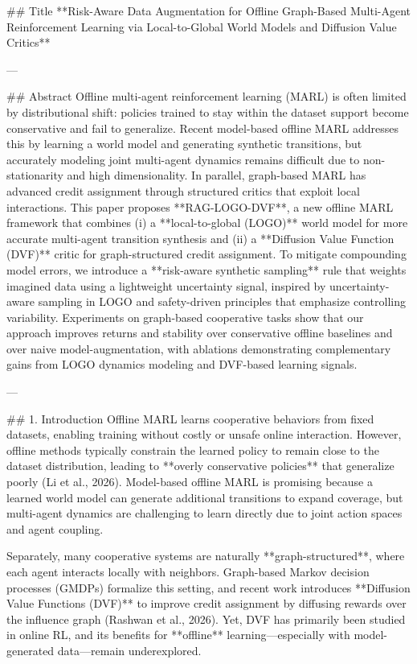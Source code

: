 ## Title  
**Risk-Aware Data Augmentation for Offline Graph-Based Multi-Agent Reinforcement Learning via Local-to-Global World Models and Diffusion Value Critics**

---

## Abstract  
Offline multi-agent reinforcement learning (MARL) is often limited by distributional shift: policies trained to stay within the dataset support become conservative and fail to generalize. Recent model-based offline MARL addresses this by learning a world model and generating synthetic transitions, but accurately modeling joint multi-agent dynamics remains difficult due to non-stationarity and high dimensionality. In parallel, graph-based MARL has advanced credit assignment through structured critics that exploit local interactions. This paper proposes **RAG-LOGO-DVF**, a new offline MARL framework that combines (i) a **local-to-global (LOGO)** world model for more accurate multi-agent transition synthesis and (ii) a **Diffusion Value Function (DVF)** critic for graph-structured credit assignment. To mitigate compounding model errors, we introduce a **risk-aware synthetic sampling** rule that weights imagined data using a lightweight uncertainty signal, inspired by uncertainty-aware sampling in LOGO and safety-driven principles that emphasize controlling variability. Experiments on graph-based cooperative tasks show that our approach improves returns and stability over conservative offline baselines and over naive model-augmentation, with ablations demonstrating complementary gains from LOGO dynamics modeling and DVF-based learning signals.

---

## 1. Introduction  
Offline MARL learns cooperative behaviors from fixed datasets, enabling training without costly or unsafe online interaction. However, offline methods typically constrain the learned policy to remain close to the dataset distribution, leading to **overly conservative policies** that generalize poorly (Li et al., 2026). Model-based offline MARL is promising because a learned world model can generate additional transitions to expand coverage, but multi-agent dynamics are challenging to learn directly due to joint action spaces and agent coupling.

Separately, many cooperative systems are naturally **graph-structured**, where each agent interacts locally with neighbors. Graph-based Markov decision processes (GMDPs) formalize this setting, and recent work introduces **Diffusion Value Functions (DVF)** to improve credit assignment by diffusing rewards over the influence graph (Rashwan et al., 2026). Yet, DVF has primarily been studied in online RL, and its benefits for **offline** learning—especially with model-generated data—remain underexplored.

